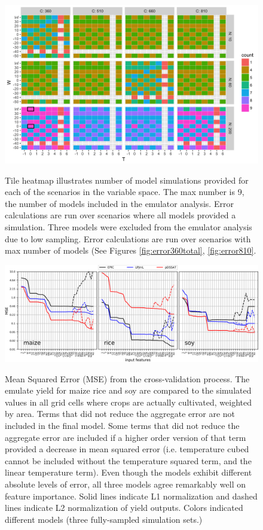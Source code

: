 \documentclass[10pt]{article}
\begin{document}
{\begin{figure}[h!]
\includegraphics[width=\textwidth]{s_how_many_simulations.png}\\
\caption{Tile heatmap illustrates number of model simulations provided for each of the scenarios in the variable space. The max number is 9, the number of models included in the emulator analysis. Error calculations are run over scenarios where all models provided a simulation. Three models were excluded from the emulator analysis due to low sampling. Error calculations are run over scenarios with max number of models (See Figures \ref{fig:error360total}, \ref{fig:error810}.}
\label{fig:numbersims}
\end{figure}

\begin{figure}[h!]
\includegraphics[width=\textwidth]{s_feature_selection.png}\\
\caption{Mean Squared Error (MSE) from the cross-validation process. The emulate yield for maize rice and soy are compared to the simulated values in all grid cells where crops are actually cultivated, weighted by area. Terms that did not reduce the aggregate error are not included in the final model. Some terms that did not reduce the aggregate error are included if a higher order version of that term provided a decrease in mean squared error (i.e. temperature cubed cannot be included without the temperature squared term, and the linear temperature term). Even though the models exhibit different absolute levels of error, all three models agree remarkably well on feature importance. Solid lines indicate L1 normalization and dashed lines indicate L2 normalization of yield outputs. Colors indicated different models (three fully-sampled simulation sets.)}
\label{fig:featureselection}
\end{figure}

}
\end{document}
